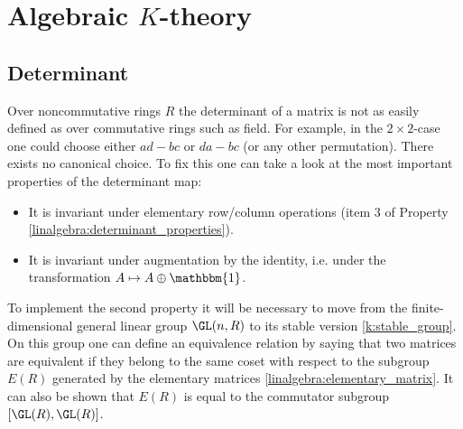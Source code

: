{    

\section{\texorpdfstring{Algebraic $K$-theory}{Algebraic K-theory}}
\subsection{Determinant}

    Over noncommutative rings $R$ the determinant of a matrix is not as easily defined as over commutative rings such as field. For example, in the $2\times2$-case one could choose either $ad-bc$ or $da-bc$ (or any other permutation). There exists no canonical choice. To fix this one can take a look at the most important properties of the determinant map:
    \begin{itemize}
        \item It is invariant under elementary row/column operations (item 3 of Property \ref{linalgebra:determinant_properties}).
        \item It is invariant under augmentation by the identity, i.e. under the transformation $A\mapsto A\oplus\mathbbm{1}$.
    \end{itemize}
    To implement the second property it will be necessary to move from the finite-dimensional general linear group $\GL(n,R)$ to its stable version \ref{k:stable_group}. On this group one can define an equivalence relation by saying that two matrices are equivalent if they belong to the same coset with respect to the subgroup $E(R)$ generated by the elementary matrices \ref{linalgebra:elementary_matrix}. It can also be shown that $E(R)$ is equal to the commutator subgroup $[\GL(R),\GL(R)]$.

}
